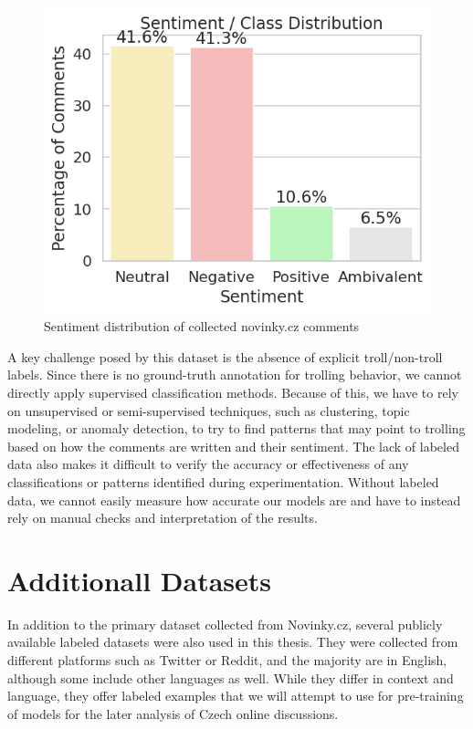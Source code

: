 \documentclass[twoside]{ctuthesis}
\theoremstyle{plain}
\theoremstyle{definition}
\theoremstyle{note}
\begin{document}
\begin{figure}[htbp]     
  \centering         
  \includegraphics[scale=0.7]{figures/sentiment.png}
  \caption{Sentiment distribution of collected novinky.cz comments}  
  \label{fig:myplot}     
\end{figure}

A key challenge posed by this dataset is the absence of explicit troll/non-troll labels. Since there is no ground-truth annotation for trolling behavior, we cannot directly apply supervised classification methods. Because of this, we have to rely on unsupervised or semi-supervised techniques, such as clustering, topic modeling, or anomaly detection, to try to find patterns that may point to trolling based on how the comments are written and their sentiment. The lack of labeled data also makes it difficult to verify the accuracy or effectiveness of any classifications or patterns identified during experimentation. Without labeled data, we cannot easily measure how accurate our models are and have to instead rely on manual checks and interpretation of the results.\par

\section{Additionall Datasets}

In addition to the primary dataset collected from Novinky.cz, several publicly available labeled datasets were also used in this thesis. They were collected from different platforms such as Twitter or Reddit, and the majority are in English, although some include other languages as well. While they differ in context and language, they offer labeled examples that we will attempt to use for pre-training of models for the later analysis of Czech online discussions.\par
\end{document}
